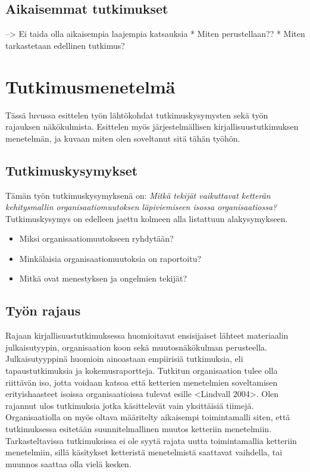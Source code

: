 \subsection{Aikaisemmat tutkimukset}

--> Ei taida olla aikaisempia laajempia katsauksia
    * Miten perustellaan??
    * Miten tarkastetaan edellinen tutkimus?



\section{Tutkimusmenetelmä}
\label{sec:menetelma}

Tässä luvussa esittelen työn lähtökohdat tutkimuskysymysten sekä työn rajauksen
näkökulmista. Esittelen myös järjestelmällisen kirjallisuustutkimuksen
menetelmän, ja kuvaan miten olen soveltanut sitä tähän työhön.

\subsection{Tutkimuskysymykset}

Tämän työn tutkimuskysymyksenä on: \textit{Mitkä tekijät vaikuttavat ketterän
kehitysmallin organisaatiomuutoksen läpiviemiseen isossa organisaatiossa?}
Tutkimuskysymys on edelleen jaettu kolmeen alla listattuun alakysymykseen.

\begin{itemize}
\item Miksi organisaatiomuutokseen ryhdytään?
\item Minkälaisia organisaatiomuutoksia on raportoitu?
\item Mitkä ovat menestyksen ja ongelmien tekijät?
\end{itemize}

\subsection{Työn rajaus}

Rajaan kirjallisuustutkimuksessa huomioitavat ensisijaiset lähteet materiaalin
julkaisutyypin, organisaation koon sekä muutosnäkökulman perusteella.
Julkaisutyyppinä huomioin ainoastaan empiirisiä tutkimuksia, eli
tapaustutkimuksia ja kokemusraportteja. Tutkitun organisaation tulee olla
riittävän iso, jotta voidaan katsoa että ketterien menetelmien soveltamisen
erityishaasteet isoissa organisaatioissa tulevat esille <Lindvall 2004>. Olen
rajannut ulos tutkimuksia jotka käsittelevät vain yksittäisiä tiimejä.
Organisaatiolla on myös oltava määritelty aikaisempi toimintamalli siten, että
tutkimuksessa esitetään suunnitelmallinen muutos ketteriin menetelmiin.
Tarkasteltavissa tutkimuksissa ei ole syytä rajata uutta toimintamallia
ketteriin menetelmiin, sillä käsitykset ketteristä menetelmistä saattavat
vaihdella, tai muunnos saattaa olla vielä kesken.

